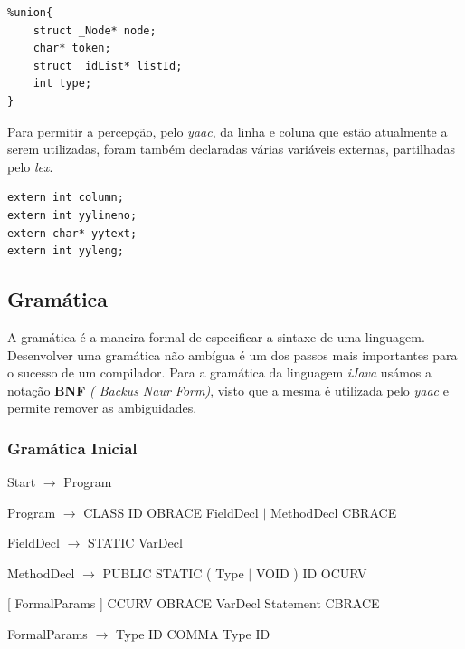\documentclass[12pt]{article}
\begin{document}
\begin{lstlisting}
%union{
    struct _Node* node;
    char* token;
    struct _idList* listId;
    int type;
}
\end{lstlisting}   
\pagebreak
\par Para permitir a percepção, pelo \emph{yaac}, da linha e coluna que estão atualmente a serem utilizadas, foram também declaradas várias variáveis externas, partilhadas pelo \emph{lex}.
\lstset{language=c,caption=Variáveis externas,label=Estruturas2}
\begin{lstlisting}
extern int column;
extern int yylineno;
extern char* yytext;
extern int yyleng;
\end{lstlisting}  


\subsection{Gramática}

A gramática é a maneira formal de especificar a sintaxe de uma linguagem. 
Desenvolver uma gramática não ambígua é um dos passos mais importantes para o sucesso de um compilador. Para a gramática da linguagem \emph{iJava} usámos a notação \textbf{BNF} \emph{( Backus Naur Form)}, visto que a mesma é utilizada pelo \emph{yaac} e permite remover as ambiguidades. 


\subsubsection{Gramática Inicial}

\vspace{0.5cm}

\hspace{-1cm}Start $\rightarrow$ Program

\hspace{-1cm}Program $\rightarrow$ CLASS ID OBRACE { FieldDecl $\mid$ MethodDecl } CBRACE

\hspace{-1cm}FieldDecl $\rightarrow$ STATIC VarDecl

\hspace{-1cm}MethodDecl $\rightarrow$ PUBLIC STATIC ( Type $\mid$ VOID ) ID OCURV

[ FormalParams ] CCURV OBRACE { VarDecl } { Statement } CBRACE

\hspace{-1cm}FormalParams $\rightarrow$ Type ID { COMMA Type ID }
\end{document}
